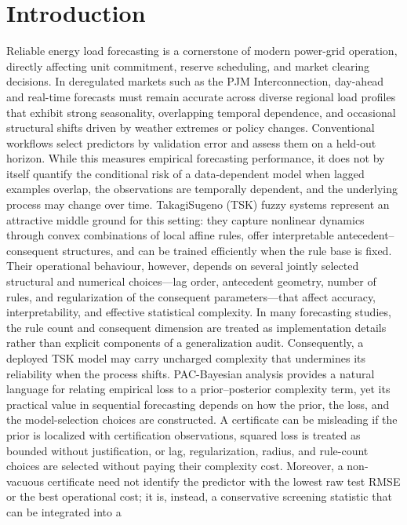 \section{Introduction}
\label{sec:introduction}
Reliable energy load forecasting is a cornerstone of modern power-grid operation, 
directly affecting unit commitment, reserve scheduling, and market clearing 
decisions. In deregulated markets such as the PJM Interconnection, day-ahead and 
real-time forecasts must remain accurate across diverse regional load profiles that 
exhibit strong seasonality, overlapping temporal dependence, and occasional 
structural shifts driven by weather extremes or policy changes. Conventional 
workflows select predictors by validation error and assess them on a held-out 
horizon. While this measures empirical forecasting performance, it does not by 
itself quantify the conditional risk of a data-dependent model when lagged examples 
overlap, the observations are temporally dependent, and the underlying process may 
change over time.
Takagi\-\-Sugeno (TSK) fuzzy systems represent an attractive middle ground for this 
setting: they capture nonlinear dynamics through convex combinations of local 
affine rules, offer interpretable antecedent--consequent structures, and can be 
trained efficiently when the rule base is fixed. Their operational behaviour, 
however, depends on several jointly selected structural and numerical choices---lag 
order, antecedent geometry, number of rules, and regularization of the consequent 
parameters---that affect accuracy, interpretability, and effective statistical 
complexity. In many forecasting studies, the rule count and consequent dimension 
are treated as implementation details rather than explicit components of a 
generalization audit. Consequently, a deployed TSK model may carry uncharged 
complexity that undermines its reliability when the process shifts.
PAC-Bayesian analysis provides a natural language for relating empirical loss to a 
prior--posterior complexity term, yet its practical value in sequential forecasting 
depends on how the prior, the loss, and the model-selection choices are 
constructed. A certificate can be misleading if the prior is localized with 
certification observations, squared loss is treated as bounded without 
justification, or lag, regularization, radius, and rule-count choices are selected 
without paying their complexity cost. Moreover, a non-vacuous certificate need not 
identify the predictor with the lowest raw test RMSE or the best operational cost; 
it is, instead, a conservative screening statistic that can be integrated into a 
